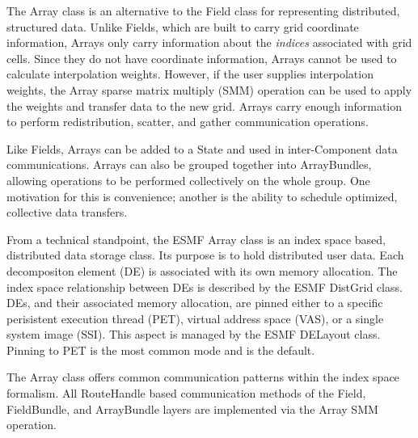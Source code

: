 %

The Array class is an alternative to the Field class for representing
distributed, structured data.  Unlike Fields, which are built to carry
grid coordinate information, Arrays only carry information about the
{\it indices} associated with grid cells.  Since they do not have coordinate
information, Arrays cannot be used to calculate interpolation weights.
However, if the user supplies interpolation weights, the Array sparse
matrix multiply (SMM) operation can be used to apply the weights and transfer
data to the new grid.  Arrays carry enough information to perform
redistribution, scatter, and gather communication operations.

Like Fields, Arrays can be added to a State and used in inter-Component
data communications.  Arrays can also be grouped together into ArrayBundles,
allowing operations to be performed collectively on the whole group.  One
motivation for this is convenience; another is the ability to schedule
optimized, collective data transfers.

From a technical standpoint, the ESMF Array class is an index space based,
distributed data storage class. Its purpose is to hold distributed user data.
Each decompositon element (DE) is associated with its own memory allocation. The
index space relationship between DEs is described by the ESMF DistGrid class.
DEs, and their associated memory allocation, are pinned either to a specific
perisistent execution thread (PET), virtual address space (VAS), or a single
system image (SSI). This aspect is managed by the ESMF DELayout class. Pinning
to PET is the most common mode and is the default.

The Array class offers common communication patterns within the index space
formalism. All RouteHandle based communication methods of the Field,
FieldBundle, and ArrayBundle layers are implemented via the Array SMM operation.
